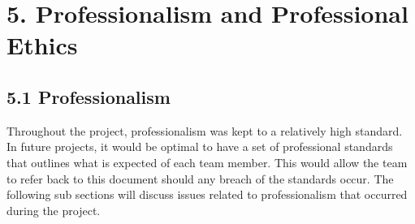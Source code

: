 \documentclass[11pt]{article}
\begin{document}

\section{5. Professionalism and Professional Ethics}

\subsection{5.1 Professionalism}
Throughout the project, professionalism was kept to a relatively high standard. In future projects, it would be optimal to have a set of professional standards that outlines what is expected of each team member. This would allow the team to refer back to this document should any breach of the standards occur. The following sub sections will discuss issues related to professionalism that occurred during the project.\\
\end{document}
